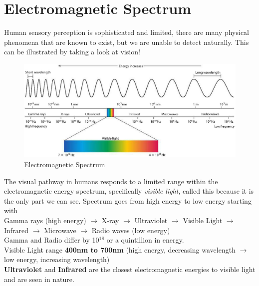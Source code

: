 \documentclass{article}
\begin{document}
\section{Electromagnetic Spectrum}
Human sensory perception is sophisticated and limited, there are many physical phenomena that are known to exist, but we are unable to detect naturally. This can be illustrated by taking a look at vision! \\

\begin{figure}[htp]
\centering
\includegraphics[width=14cm]{images/electro.jpg}
\caption{Electromagnetic Spectrum}
\label{fig:Electromagnetic Spectrum}
\end{figure}

The visual pathway in humans responds to a limited range within the electromagnetic energy spectrum, specifically \textit{visible light}, called this because it is the only part we can see. Spectrum goes from high energy to low energy starting with \\
Gamma rays (high energy) $\rightarrow$ X-ray $\rightarrow$ Ultraviolet $\rightarrow$ Visible Light $\rightarrow$ Infrared $\rightarrow$ Microwave $\rightarrow$ Radio waves (low energy) \\
Gamma and Radio differ by 10$^{18}$ or a quintillion in energy. \\
Visible Light range \textbf{400nm to 700nm} (high energy, decreasing wavelength $\rightarrow$ low energy, increasing wavelength)\\
\textbf{Ultraviolet} and \textbf{Infrared} are the closest electromagnetic energies to visible light and are seen in nature. \\
\end{document}
